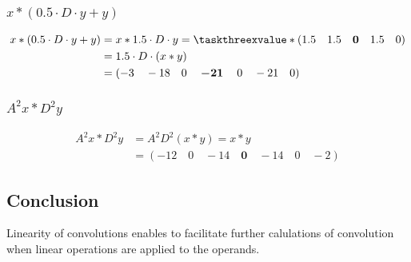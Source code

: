 \documentclass[a4paper]{article}
\theoremstyle{break}
\theoremstyle{break}
\begin{document}
\subsubsection*{$x \ast (0.5 \cdot D \cdot y + y)$}

\begin{equation*}
  \begin{split}
    x \ast (0.5 \cdot D \cdot y + y) &= x \ast 1.5 \cdot D \cdot y = \taskthreexvalue \ast \left( 1.5 \quad 1.5 \quad \boldsymbol{0} \quad 1.5 \quad 0 \right) \\
      &= 1.5 \cdot D \cdot (x \ast y) \\
      &= \left( -3 \quad -18 \quad 0 \quad \boldsymbol{-21} \quad 0 \quad -21 \quad 0 \right)
  \end{split}
\end{equation*}

\subsubsection*{$A^{2} x \ast D^{2} y$}

\begin{equation*}
  \begin{split}
    A^{2} x \ast D^{2} y &= A^{2} D^{2} (x \ast y) = x \ast y \\
      &= \left( -12 \quad 0 \quad -14 \quad \boldsymbol{0} \quad -14 \quad 0 \quad -2 \right)
  \end{split}
\end{equation*}

\subsection*{Conclusion}

Linearity of convolutions enables to facilitate further calulations of convolution when linear operations are applied to the operands.
\end{document}

